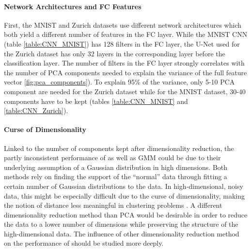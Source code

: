 \documentclass[10pt]{article}
\begin{document}
\paragraph{Network Architectures and \gls{FC} Features}  First, the MNIST and Zurich datasets use different network architectures which both yield a different number of features in the \gls{FC} layer. While the \gls{MNIST} \gls{CNN} (table \ref{table:CNN_MNIST}) has 128 filters in the \gls{FC} layer, the U-Net used for the Zurich dataset has only 32 layers in the corresponding layer before the classification layer. The number of filters in the \gls{FC} layer strongly correlates with the number of \gls{PCA} components needed to explain the variance of the full feature vector \ref{fig:pca_components}). To explain 95\% of the variance, only 5-10 \gls{PCA} component are needed for the Zurich dataset while for the \gls{MNIST} dataset, 30-40 components have to be kept (tables \ref{table:CNN_MNIST} and \ref{table:CNN_Zurich}).

\paragraph{Curse of Dimensionality} Linked to the number of components kept after dimensionality reduction, the partly inconsistent performance of  as well as \gls{GMM} could be due to their underlying assumption of a Gaussian distribution in high dimensions. Both methods rely on finding the support of the ``normal'' data through fitting a certain number of Gaussian distributions to the data. In high-dimensional, noisy data, this might be especially difficult due to the curse of dimensionality, making the notion of distance less meaningful in clustering problems \cite{Hinneburg2000WhatIT}. A different dimensionality reduction method than \gls{PCA} would be desirable in order to reduce the data to a lower number of dimensions while preserving the structure of the high-dimensional data. The influence of other dimensionality reduction method on the performance of  should be studied more deeply.

\end{document}
